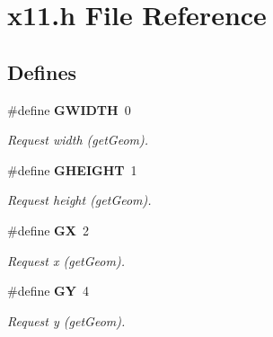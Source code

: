 \section{x11.h File Reference}
\label{x11_8h}
\subsection*{Defines}
\begin{CompactItemize}
\item 
\#define {\bf GWIDTH}~0
\begin{CompactList}\small\item\em Request width (get\-Geom). \item\end{CompactList}\item 
\#define {\bf GHEIGHT}~1
\begin{CompactList}\small\item\em Request height (get\-Geom). \item\end{CompactList}\item 
\#define {\bf GX}~2
\begin{CompactList}\small\item\em Request x (get\-Geom). \item\end{CompactList}\item 
\#define {\bf GY}~4
\begin{CompactList}\small\item\em Request y (get\-Geom). \item\end{CompactList}\end{CompactItemize}
